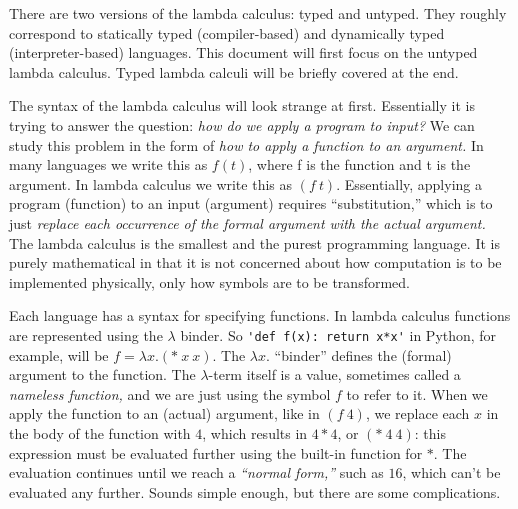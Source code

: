 There are two versions of the lambda calculus: typed and untyped.  They
roughly correspond to statically typed (compiler-based) and
dynamically typed (interpreter-based) languages.  This document will
first focus on the untyped lambda calculus.  Typed lambda calculi will be
briefly covered at the end.

\medskip

The syntax of the lambda calculus will look strange at first.
Essentially it is trying to answer the question: {\em how do we apply
  a program to input?\/} We can study this problem in the form of {\em
  how to apply a function to an argument.\/} In many languages we
write this as $f(t)$, where f is the function and t is the argument.
In lambda calculus we write this as $(f~ t)$.  Essentially, applying a
program (function) to an input (argument) requires ``substitution,''
which is to just {\em replace each occurrence of the formal argument
  with the actual argument.\/} The lambda calculus is the smallest and
the purest programming language. It is purely mathematical in that it
is not concerned about how computation is to be implemented
physically, only how symbols are to be transformed.

Each language has a syntax for specifying functions.  In lambda
calculus functions are represented using the $\lambda$ binder.  So
\verb+'def f(x): return x*x'+ in Python, for example, will be $f =
\lambda x.(*~x~x)$.  The $\lambda x.$ ``binder'' defines the (formal)
argument to the function.  The $\lambda$-term itself is a value,
sometimes called a {\em nameless function,\/} and we are just using
the symbol $f$ to refer to it.  When we apply the function to an
(actual) argument, like in $(f~4)$, we replace each $x$ in the body of
the function with $4$, which results in $4*4$, or $(*~4~4)$: this
expression must be evaluated further using the built-in function for
$*$.  The evaluation continues until we reach a {\em ``normal
  form,''\/} such as $16$, which can't be evaluated any further.
Sounds simple enough, but there are some complications.

